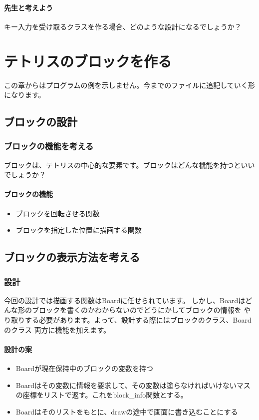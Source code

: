 \documentclass[12pt, a4paper, dvipdfmx]{book}
\begin{document}
\subsubsection{先生と考えよう}
キー入力を受け取るクラスを作る場合、どのような設計になるでしょうか？

\chapter{テトリスのブロックを作る}
この章からはプログラムの例を示しません。今までのファイルに追記していく形になります。
\section{ブロックの設計}
\subsection{ブロックの機能を考える}
ブロックは、テトリスの中心的な要素です。ブロックはどんな機能を持つといいでしょうか？
\subsubsection{ブロックの機能}
\begin{itemize}
  \item ブロックを回転させる関数
  \item ブロックを指定した位置に描画する関数
\end{itemize}

\section{ブロックの表示方法を考える}
\subsection{設計}
今回の設計では描画する関数はBoardに任せられています。
しかし、Boardはどんな形のブロックを書くのかわからないのでどうにかしてブロックの情報を
やり取りする必要があります。よって、設計する際にはブロックのクラス、Boardのクラス
両方に機能を加えます。
\subsubsection{設計の案}
\begin{itemize}
  \item Boardが現在保持中のブロックの変数を持つ
  \item Boardはその変数に情報を要求して、その変数は塗らなければいけないマスの座標をリストで返す。これをblock\_info関数とする。
  \item Boardはそのリストをもとに、drawの途中で画面に書き込むことにする
\end{itemize}
\end{document}
